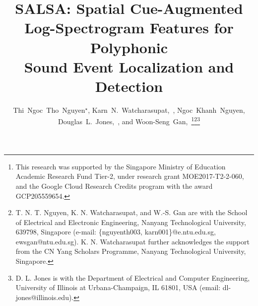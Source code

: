 \documentclass[journal]{IEEEtran}
\begin{document}
\title{SALSA: Spatial Cue-Augmented\\Log-Spectrogram Features for Polyphonic\\Sound Event Localization and Detection}


\author{Thi~Ngoc~Tho~Nguyen$^{\star}$,
        Karn~N.~Watcharasupat,~,
        Ngoc~Khanh~Nguyen,
        Douglas~L.~Jones,~,
	    and Woon-Seng~Gan,~\thanks{This research was supported by the Singapore Ministry of Education Academic Research Fund Tier-2, under research grant MOE2017-T2-2-060, and the Google Cloud Research Credits program with the award GCP205559654.}\thanks{T. N. T. Nguyen, K. N. Watcharasupat, and W.-S. Gan are with the School of Electrical and Electronic Engineering, Nanyang Technological University, 639798, Singapore (e-mail: \{nguyenth003, karn001\}@e.ntu.edu.sg, ewsgan@ntu.edu.sg). K. N. Watcharasupat further acknowledges the support from the CN Yang Scholars Programme, Nanyang Technological University, Singapore.}\thanks{D. L. Jones is with the Department of Electrical and Computer Engineering, University of Illinois at Urbana-Champaign, IL 61801, USA (email: dl-jones@illinois.edu).}}



















\maketitle
\end{document}
